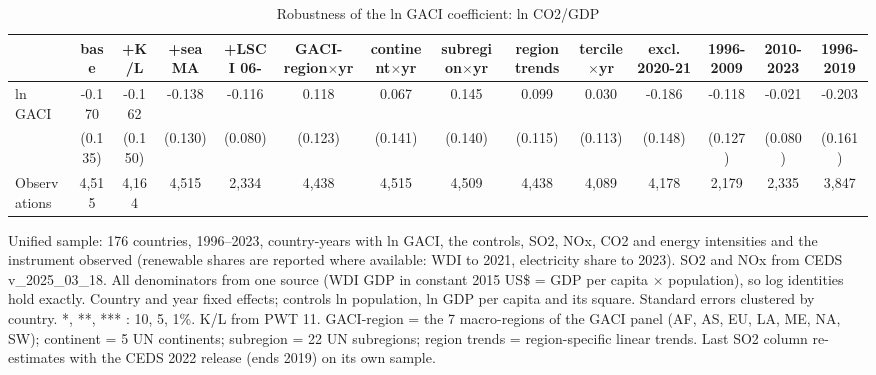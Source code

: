 \begin{table}[htbp]\centering\small
\caption{Robustness of the ln GACI coefficient: ln CO2/GDP}\label{tab:A1b}
\begin{tabular}{lccccccccccccc}
\toprule
 & base & +K/L & +sea MA & +LSCI 06- & GACI-region$\times$yr & continent$\times$yr & subregion$\times$yr & region trends & tercile$\times$yr & excl. 2020-21 & 1996-2009 & 2010-2023 & 1996-2019 \\
\midrule
ln GACI & -0.170 & -0.162 & -0.138 & -0.116 & 0.118 & 0.067 & 0.145 & 0.099 & 0.030 & -0.186 & -0.118 & -0.021 & -0.203 \\
 & (0.135) & (0.150) & (0.130) & (0.080) & (0.123) & (0.141) & (0.140) & (0.115) & (0.113) & (0.148) & (0.127) & (0.080) & (0.161) \\
\midrule
Observations & 4,515 & 4,164 & 4,515 & 2,334 & 4,438 & 4,515 & 4,509 & 4,438 & 4,089 & 4,178 & 2,179 & 2,335 & 3,847 \\
\bottomrule
\end{tabular}
\begin{minipage}{0.95\textwidth}\footnotesize Unified sample: 176 countries, 1996--2023, country-years with ln GACI, the controls, SO2, NOx, CO2 and energy intensities and the instrument observed (renewable shares are reported where available: WDI to 2021, electricity share to 2023). SO2 and NOx from CEDS v\_2025\_03\_18. All denominators from one source (WDI GDP in constant 2015 US\$ = GDP per capita $\times$ population), so log identities hold exactly. Country and year fixed effects; controls ln population, ln GDP per capita and its square. Standard errors clustered by country. *, **, *** : 10, 5, 1\%. K/L from PWT 11. GACI-region = the 7 macro-regions of the GACI panel (AF, AS, EU, LA, ME, NA, SW); continent = 5 UN continents; subregion = 22 UN subregions; region trends = region-specific linear trends. Last SO2 column re-estimates with the CEDS 2022 release (ends 2019) on its own sample.\end{minipage}
\end{table}